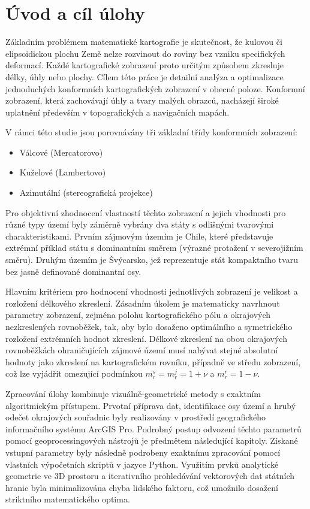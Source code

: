 \documentclass[12pt, a4paper]{article}
\begin{document}
\section{Úvod a cíl úlohy}

Základním problémem matematické kartografie je skutečnost, že kulovou či elipsoidickou plochu Země nelze rozvinout do roviny bez vzniku specifických deformací. Každé kartografické zobrazení proto určitým způsobem zkresluje délky, úhly nebo plochy. Cílem této práce je detailní analýza a optimalizace jednoduchých konformních kartografických zobrazení v obecné poloze. Konformní zobrazení, která zachovávají úhly a tvary malých obrazců, nacházejí široké uplatnění především v topografických a navigačních mapách.

V rámci této studie jsou porovnávány tři základní třídy konformních zobrazení: 
\begin{itemize}
    \item Válcové (Mercatorovo)
    \item Kuželové (Lambertovo)
    \item Azimutální (stereografická projekce)
\end{itemize}

Pro objektivní zhodnocení vlastností těchto zobrazení a jejich vhodnosti pro různé typy území byly záměrně vybrány dva státy s odlišnými tvarovými charakteristikami. Prvním zájmovým územím je Chile, které představuje extrémní příklad státu s dominantním směrem (výrazné protažení v severojižním směru). Druhým územím je Švýcarsko, jež reprezentuje stát kompaktního tvaru bez jasně definované dominantní osy.

Hlavním kritériem pro hodnocení vhodnosti jednotlivých zobrazení je velikost a rozložení délkového zkreslení. Zásadním úkolem je matematicky navrhnout parametry zobrazení, zejména polohu kartografického pólu a okrajových nezkreslených rovnoběžek, tak, aby bylo dosaženo optimálního a symetrického rozložení extrémních hodnot zkreslení. Délkové zkreslení na obou okrajových rovnoběžkách ohraničujících zájmové území musí nabývat stejné absolutní hodnoty jako zkreslení na kartografickém rovníku, případně ve středu zobrazení, což lze vyjádřit omezující podmínkou $m_r^s = m_r^j = 1 + \nu$ a $m_r^r = 1 - \nu$.

Zpracování úlohy kombinuje vizuálně-geometrické metody s exaktním algoritmickým přístupem. Prvotní příprava dat, identifikace osy území a hrubý odečet okrajových souřadnic byly realizovány v prostředí geografického informačního systému ArcGIS Pro. Podrobný postup odvození těchto parametrů pomocí geoprocessingových nástrojů je předmětem následující kapitoly. Získané vstupní parametry byly následně podrobeny exaktnímu zpracování pomocí vlastních výpočetních skriptů v jazyce Python. Využitím prvků analytické geometrie ve 3D prostoru a iterativního prohledávání vektorových dat státních hranic byla minimalizována chyba lidského faktoru, což umožnilo dosažení striktního matematického optima.
\clearpage
\newpage
\end{document}
